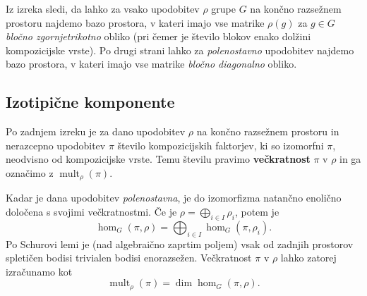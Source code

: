 \documentclass[11pt]{book}
\DeclareMathOperator\mult{mult}
\def\definicija{\color{rdeca}\bf}
\theoremstyle{definition}
\theoremstyle{zgled}
\theoremstyle{zgledbrezstevilke}
\theoremstyle{odprtproblem}
\theoremstyle{domacanaloga}
\theoremstyle{izrek}
\begin{document}
Iz izreka sledi, da lahko za vsako upodobitev $\rho$ grupe $G$ na končno razsežnem prostoru najdemo bazo prostora, v kateri imajo vse matrike $\rho(g)$ za $g \in G$ \emph{bločno zgornjetrikotno} obliko (pri čemer je število blokov enako dolžini kompozicijske vrste). Po drugi strani lahko za \emph{polenostavno} upodobitev najdemo bazo prostora, v kateri imajo vse matrike \emph{bločno diagonalno} obliko.

\subsection{Izotipične komponente}

Po zadnjem izreku je za dano upodobitev $\rho$ na končno razsežnem prostoru in nerazcepno upodobitev $\pi$ število kompozicijskih faktorjev, ki so izomorfni $\pi$, neodvisno od kompozicijske vrste. Temu številu pravimo {\definicija večkratnost} $\pi$ v $\rho$ in ga označimo z $\mult_{\rho}(\pi)$. 

Kadar je dana upodobitev \emph{polenostavna}, je do izomorfizma natančno enolično določena s svojimi večkratnostmi. Če je $\rho = \bigoplus_{i \in I} \rho_i$, potem je
\[
    \hom_G(\pi, \rho) = \bigoplus_{i \in I} \hom_G(\pi, \rho_i).
\]
Po Schurovi lemi je (nad algebraično zaprtim poljem) vsak od zadnjih prostorov spletičen bodisi trivialen bodisi enorazsežen. Večkratnost $\pi$ v $\rho$ lahko zatorej izračunamo kot
\[
    \textstyle \mult_{\rho}(\pi) = \dim \hom_G(\pi, \rho).
\]
\end{document}
